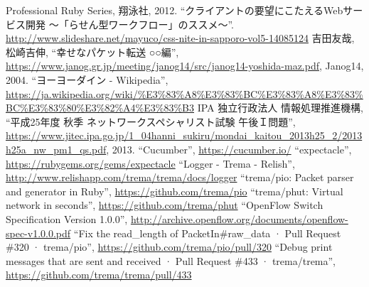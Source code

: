 \begin{thebibliography}{99}
         Professional Ruby Series, 翔泳社, 2012.
         ``クライアントの要望にこたえるWebサービス開発 ～「らせん型ワークフロー」のススメ～''.
         \url{http://www.slideshare.net/mayuco/css-nite-in-sapporo-vol5-14085124}
         吉田友哉, 松崎吉伸,
         ``幸せなパケット転送 ○○編'',
         \url{https://www.janog.gr.jp/meeting/janog14/src/janog14-yoshida-maz.pdf},
         Janog14, 2004.
         ``ヨーヨーダイン - Wikipedia'',
         \url{https://ja.wikipedia.org/wiki/\%E3\%83\%A8\%E3\%83\%BC\%E3\%83\%A8\%E3\%83\%BC\%E3\%83\%80\%E3\%82\%A4\%E3\%83\%B3}
         IPA 独立行政法人 情報処理推進機構,
         ``平成25年度 秋季 ネットワークスペシャリスト試験 午後Ｉ問題'',
         \url{https://www.jitec.ipa.go.jp/1_04hanni_sukiru/mondai_kaitou_2013h25_2/2013h25a_nw_pm1_qs.pdf}, 2013.
         ``Cucumber'',
         \url{https://cucumber.io/}
         ``expectacle'',
         \url{https://rubygems.org/gems/expectacle}
         ``Logger - Trema - Relish'',
         \url{http://www.relishapp.com/trema/trema/docs/logger}
         ``trema/pio: Packet parser and generator in Ruby'',
         \url{https://github.com/trema/pio}
         ``trema/phut: Virtual network in seconds'',
         \url{https://github.com/trema/phut}
         ``OpenFlow Switch Specification Version 1.0.0'',
         \url{http://archive.openflow.org/documents/openflow-spec-v1.0.0.pdf}
         ``Fix the read\_length of PacketIn\#raw\_data · Pull Request \#320 · trema/pio'',
         \url{https://github.com/trema/pio/pull/320}
  ``Debug print messages that are sent and received · Pull Request \#433 · trema/trema'',
         \url{https://github.com/trema/trema/pull/433}
\end{thebibliography}

